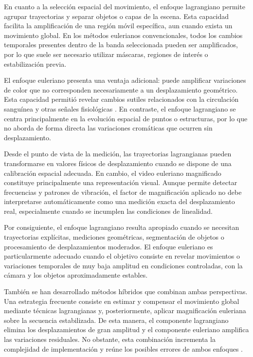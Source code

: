 En cuanto a la selección espacial del movimiento, el enfoque lagrangiano permite agrupar trayectorias y separar objetos o capas de la escena. Esta capacidad facilita la amplificación de una región móvil específica, aun cuando exista un movimiento global. En los métodos eulerianos convencionales, todos los cambios temporales presentes dentro de la banda seleccionada pueden ser amplificados, por lo que suele ser necesario utilizar máscaras, regiones de interés o estabilización previa.

El enfoque euleriano presenta una ventaja adicional: puede amplificar variaciones de color que no corresponden necesariamente a un desplazamiento geométrico. Esta capacidad permitió revelar cambios sutiles relacionados con la circulación sanguínea y otras señales fisiológicas \cite{wu2012eulerian}. En contraste, el enfoque lagrangiano se centra principalmente en la evolución espacial de puntos o estructuras, por lo que no aborda de forma directa las variaciones cromáticas que ocurren sin desplazamiento.

Desde el punto de vista de la medición, las trayectorias lagrangianas pueden transformarse en valores físicos de desplazamiento cuando se dispone de una calibración espacial adecuada. En cambio, el video euleriano magnificado constituye principalmente una representación visual. Aunque permite detectar frecuencias y patrones de vibración, el factor de magnificación aplicado no debe interpretarse automáticamente como una medición exacta del desplazamiento real, especialmente cuando se incumplen las condiciones de linealidad.

Por consiguiente, el enfoque lagrangiano resulta apropiado cuando se necesitan trayectorias explícitas, mediciones geométricas, segmentación de objetos o procesamiento de desplazamientos moderados. El enfoque euleriano es particularmente adecuado cuando el objetivo consiste en revelar movimientos o variaciones temporales de muy baja amplitud en condiciones controladas, con la cámara y los objetos aproximadamente estables.

También se han desarrollado métodos híbridos que combinan ambas perspectivas. Una estrategia frecuente consiste en estimar y compensar el movimiento global mediante técnicas lagrangianas y, posteriormente, aplicar magnificación euleriana sobre la secuencia estabilizada. De esta manera, el componente lagrangiano elimina los desplazamientos de gran amplitud y el componente euleriano amplifica las variaciones residuales. No obstante, esta combinación incrementa la complejidad de implementación y reúne los posibles errores de ambos enfoques \cite{ahmed2023overview}.

